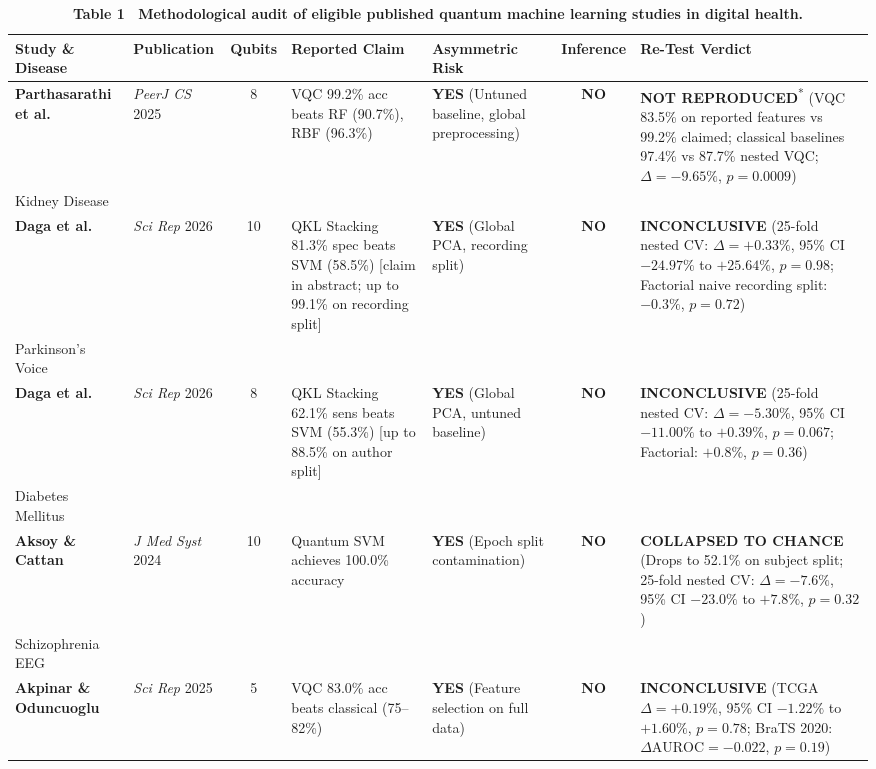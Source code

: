 \documentclass[10pt,a4paper,twoside]{article}
\begin{document}
\begin{table}[t]
\centering
\small
\caption*{\textbf{\textsf{Table 1 \textbar\ Methodological audit of eligible published quantum machine learning studies in digital health.}}}
\vspace{-4pt}
\begin{tabular}{p{3.0cm} p{2.2cm} c p{3.2cm} p{2.8cm} c p{3.2cm}}
\toprule
\textbf{Study \& Disease} & \textbf{Publication} & \textbf{Qubits} & \textbf{Reported Claim} & \textbf{Asymmetric Risk} & \textbf{Inference} & \textbf{Re-Test Verdict} \\
\midrule
\textbf{Parthasarathi et al.} & \textit{PeerJ CS} 2025 \cite{parthasarathi2025} & 8 & VQC 99.2\% acc beats RF (90.7\%), RBF (96.3\%) & \textbf{YES} (Untuned baseline, global preprocessing) & \textbf{NO} & \textbf{NOT REPRODUCED}\textsuperscript{*} (VQC 83.5\% on reported features vs 99.2\% claimed; classical baselines 97.4\% vs 87.7\% nested VQC; $\Delta = -9.65\%$, $p = 0.0009$) \\
Kidney Disease & & & & & & \\
\addlinespace
\textbf{Daga et al.} & \textit{Sci Rep} 2026 \cite{daga2026} & 10 & QKL Stacking 81.3\% spec beats SVM (58.5\%) [claim in abstract; up to 99.1\% on recording split] & \textbf{YES} (Global PCA, recording split) & \textbf{NO} & \textbf{INCONCLUSIVE} (25-fold nested CV: $\Delta = +0.33\%$, 95\% CI $-24.97\%$ to $+25.64\%$, $p = 0.98$; Factorial naive recording split: $-0.3\%$, $p = 0.72$) \\
Parkinson's Voice & & & & & & \\
\addlinespace
\textbf{Daga et al.} & \textit{Sci Rep} 2026 \cite{daga2026} & 8 & QKL Stacking 62.1\% sens beats SVM (55.3\%) [up to 88.5\% on author split] & \textbf{YES} (Global PCA, untuned baseline) & \textbf{NO} & \textbf{INCONCLUSIVE} (25-fold nested CV: $\Delta = -5.30\%$, 95\% CI $-11.00\%$ to $+0.39\%$, $p = 0.067$; Factorial: $+0.8\%$, $p = 0.36$) \\
Diabetes Mellitus & & & & & & \\
\addlinespace
\textbf{Aksoy \& Cattan} & \textit{J Med Syst} 2024 \cite{aksoy2024} & 10 & Quantum SVM achieves 100.0\% accuracy & \textbf{YES} (Epoch split contamination) & \textbf{NO} & \textbf{COLLAPSED TO CHANCE} (Drops to 52.1\% on subject split; 25-fold nested CV: $\Delta = -7.6\%$, 95\% CI $-23.0\%$ to $+7.8\%$, $p = 0.32$) \\
Schizophrenia EEG & & & & & & \\
\addlinespace
\textbf{Akpinar \& Oduncuoglu} & \textit{Sci Rep} 2025 \cite{akpinar2025} & 5 & VQC 83.0\% acc beats classical (75--82\%) & \textbf{YES} (Feature selection on full data) & \textbf{NO} & \textbf{INCONCLUSIVE} (TCGA $\Delta = +0.19\%$, 95\% CI $-1.22\%$ to $+1.60\%$, $p = 0.78$; BraTS 2020: $\Delta\text{AUROC} = -0.022$, $p = 0.19$) \\

\end{tabular}
\end{table}
\end{document}
